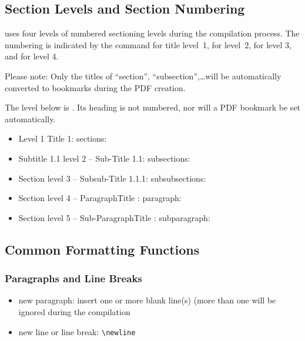 \subsection{Section Levels and Section Numbering}
\PharmRep uses four levels of numbered sectioning levels during the compilation process. The numbering is indicated by the command  for title level~1,  for level~2,  for level 3, and  for level 4.

Please note: Only the titles of \enquote{section}, \enquote{subsection},\dots will be automatically converted to bookmarks during
the PDF creation.

The level below  is . Its heading is not numbered, nor will a PDF bookmark be set automatically.
\begin{itemize}
   \item Level 1 Title 1: sections: 
   \item Subtitle 1.1 level 2 -- Sub-Title 1.1: subsections: 
   \item Section level 3 -- Subsub-Title 1.1.1: subsubsections: 
   \item Section level 4 -- ParagraphTitle : paragraph: 
   \item Section level 5 -- Sub-ParagraphTitle : subparagraph: 
\end{itemize}

\subsection{Common Formatting Functions}
\subsubsection{Paragraphs and Line Breaks}
\begin{itemize}
\item new paragraph: insert one or more blank line(s)  (more than one will
      be ignored during the compilation
\item new line or line break: \verb|\newline|
\end{itemize}

